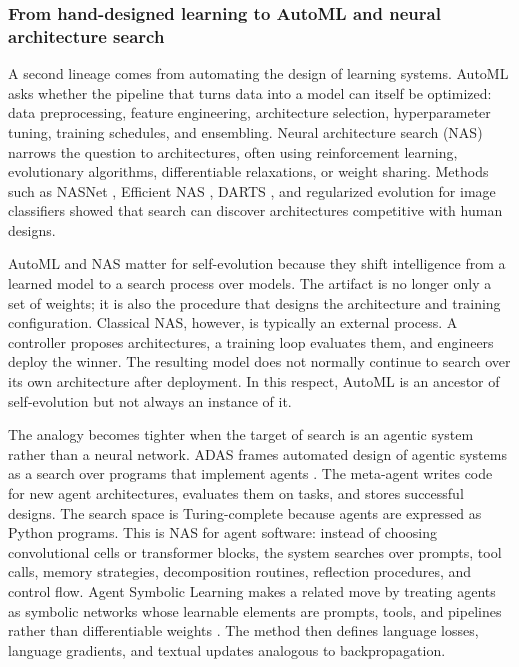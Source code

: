 \subsubsection{From hand-designed learning to AutoML and neural architecture search}

A second lineage comes from automating the design of learning systems. AutoML asks whether the pipeline that turns data into a model can itself be optimized: data preprocessing, feature engineering, architecture selection, hyperparameter tuning, training schedules, and ensembling. Neural architecture search (NAS) narrows the question to architectures, often using reinforcement learning, evolutionary algorithms, differentiable relaxations, or weight sharing. Methods such as NASNet \cite{zoph2018learning}, Efficient NAS \cite{pham2018efficient}, DARTS \cite{liu2018darts}, and regularized evolution for image classifiers \cite{real2019regularized} showed that search can discover architectures competitive with human designs.

AutoML and NAS matter for self-evolution because they shift intelligence from a learned model to a search process over models. The artifact is no longer only a set of weights; it is also the procedure that designs the architecture and training configuration. Classical NAS, however, is typically an external process. A controller proposes architectures, a training loop evaluates them, and engineers deploy the winner. The resulting model does not normally continue to search over its own architecture after deployment. In this respect, AutoML is an ancestor of self-evolution but not always an instance of it.

The analogy becomes tighter when the target of search is an agentic system rather than a neural network. ADAS frames automated design of agentic systems as a search over programs that implement agents \cite{adas2025}. The meta-agent writes code for new agent architectures, evaluates them on tasks, and stores successful designs. The search space is Turing-complete because agents are expressed as Python programs. This is NAS for agent software: instead of choosing convolutional cells or transformer blocks, the system searches over prompts, tool calls, memory strategies, decomposition routines, reflection procedures, and control flow. Agent Symbolic Learning makes a related move by treating agents as symbolic networks whose learnable elements are prompts, tools, and pipelines rather than differentiable weights \cite{agentsymboliclearning2024}. The method then defines language losses, language gradients, and textual updates analogous to backpropagation.

